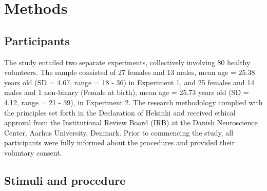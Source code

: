 \documentclass[
]{article}
\begin{document}
\newpage

\hypertarget{methods}{%
\section{Methods}\label{methods}}

\hypertarget{participants}{%
\subsection{Participants}\label{participants}}

The study entailed two separate experiments, collectively involving 80
healthy volunteers. The sample consisted of 27 females and 13 males,
mean age = 25.38 years old (SD = 4.67, range = 18 - 36) in Experiment 1,
and 25 females and 14 males and 1 non-binary (Female at birth), mean age
= 25.73 years old (SD = 4.12, range = 21 - 39), in Experiment 2. The
research methodology complied with the principles set forth in the
Declaration of Helsinki and received ethical approval from the
Institutional Review Board (IRB) at the Danish Neuroscience Center,
Aarhus University, Denmark. Prior to commencing the study, all
participants were fully informed about the procedures and provided their
voluntary consent.

\hypertarget{stimuli-and-procedure}{%
\subsection{Stimuli and procedure}\label{stimuli-and-procedure}}
\end{document}
